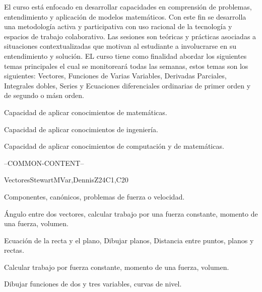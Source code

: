 \begin{syllabus}


\begin{justification}
  El curso está enfocado en desarrollar capacidades en comprensión de problemas, entendimiento y aplicación de modelos matemáticos. Con este fin se desarrolla una metodología activa y participativa con uso racional de la tecnología y espacios de trabajo colaborativo. Las sesiones son teóricas y prácticas asociadas a situaciones contextualizadas que motivan al estudiante a involucrarse en su entendimiento y solución.
  EL curso tiene como finalidad abordar los siguientes temas principales el cual se monitoreará todas las semanas, estos temas son los siguientes: Vectores, Funciones de Varias Variables, Derivadas Parciales, Integrales dobles, Series y Ecuaciones diferenciales ordinarias de primer orden y de segundo o másn orden.
\end{justification}

\begin{goals}
  \item Capacidad de aplicar conocimientos de matemáticas.
  \item Capacidad de aplicar conocimientos de ingeniería.
  \item Capacidad de aplicar conocimientos de computación y de matemáticas.
\end{goals}

--COMMON-CONTENT--

\begin{unit}{Vectores}{}{StewartMVar,DennisZ}{24}{C1,C20}
  \begin{topics}      
  \item Componentes, canónicos, problemas de fuerza o velocidad.
  \item Ángulo entre dos vectores, calcular trabajo por una fuerza constante, momento de una fuerza, volumen.
  \item Ecuación de la recta y el plano, Dibujar planos, Distancia entre puntos, planos y rectas.
  \item Calcular trabajo por fuerza constante, momento de una fuerza, volumen.
  \item Dibujar funciones de dos y tres variables, curvas de nivel.
    \end{topics}


\end{unit}
\end{syllabus}

